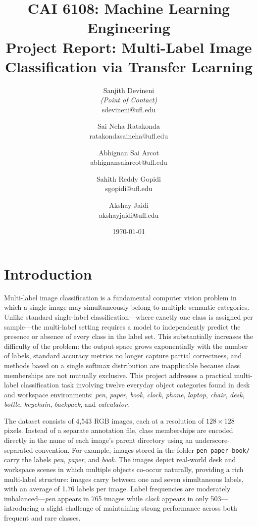 \documentclass[10pt]{article}
\title{CAI 6108: Machine Learning Engineering\\
	\large Project Report: Multi-Label Image Classification via Transfer Learning}
\author{
        Sanjith Devineni \\{\em (Point of Contact)} \\
        sdevineni@ufl.edu\\
        \and
        Sai Neha Ratakonda \\
        ratakondasaineha@ufl.edu\\
        \and
        Abhignan Sai Arcot \\
        abhignansaiarcot@ufl.edu\\
        \and
        Sahith Reddy Gopidi \\
        sgopidi@ufl.edu\\
        \and
        Akshay Jaidi \\
        akshayjaidi@ufl.edu\\
}
\date{\today}
\begin{document}

\maketitle






\section{Introduction}

Multi-label image classification is a fundamental computer vision problem in which a single image
may simultaneously belong to multiple semantic categories.  Unlike standard single-label
classification---where exactly one class is assigned per sample---the multi-label setting requires
a model to independently predict the presence or absence of every class in the label set.  This
substantially increases the difficulty of the problem: the output space grows exponentially with the
number of labels, standard accuracy metrics no longer capture partial correctness, and methods based
on a single softmax distribution are inapplicable because class memberships are not mutually
exclusive.  This project addresses a practical multi-label classification task involving twelve
everyday object categories found in desk and workspace environments: \textit{pen}, \textit{paper},
\textit{book}, \textit{clock}, \textit{phone}, \textit{laptop}, \textit{chair}, \textit{desk},
\textit{bottle}, \textit{keychain}, \textit{backpack}, and \textit{calculator}.

The dataset consists of 4,543 RGB images, each at a resolution of $128 \times 128$ pixels.
Instead of a separate annotation file, class
memberships are encoded directly in the name of each image's parent directory using an
underscore-separated convention.  For example, images stored in the folder
\texttt{pen\_paper\_book/} carry the labels \textit{pen}, \textit{paper}, and \textit{book}.
The images depict real-world desk and workspace scenes in which multiple objects co-occur
naturally, providing a rich multi-label structure: images carry between one and seven simultaneous
labels, with an average of 1.76 labels per image.  Label frequencies are moderately
imbalanced---\textit{pen} appears in 765 images while \textit{clock} appears in only
503---introducing a slight challenge of maintaining strong performance across both frequent
and rare classes.
\end{document}
